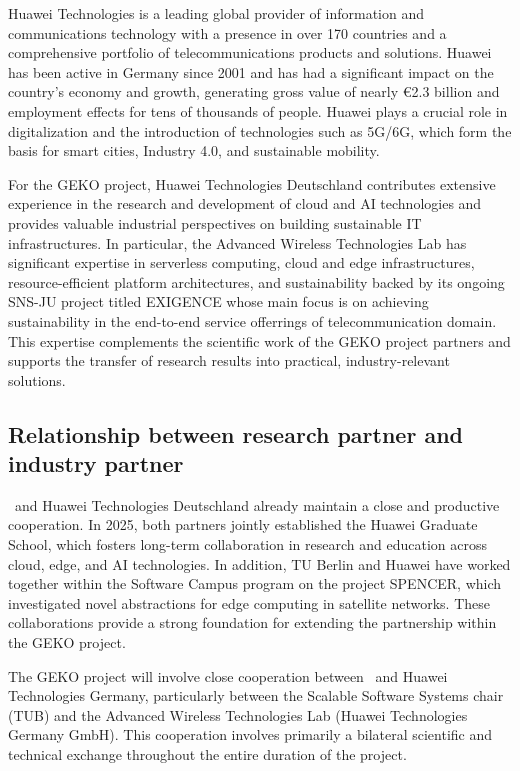 Huawei Technologies is a leading global provider of information and communications technology with a presence in over 170 countries and a comprehensive portfolio of telecommunications products and solutions.
Huawei has been active in Germany since 2001 and has had a significant impact on the country's economy and growth, generating gross value of nearly €2.3 billion and employment effects for tens of thousands of people.
Huawei plays a crucial role in digitalization and the introduction of technologies such as 5G/6G, which form the basis for smart cities, Industry 4.0, and sustainable mobility.

For the GEKO project, Huawei Technologies Deutschland contributes extensive experience in the research and development of cloud and AI technologies and provides valuable industrial perspectives on building sustainable IT infrastructures.
In particular, the Advanced Wireless Technologies Lab has significant expertise in serverless computing, cloud and edge infrastructures, resource-efficient platform architectures, and sustainability backed by its ongoing SNS-JU project titled EXIGENCE whose main focus is on achieving sustainability in the end-to-end service offerrings of telecommunication domain.
This expertise complements the scientific work of the GEKO project partners and supports the transfer of research results into practical, industry-relevant solutions.


\subsection{Relationship between research partner and industry partner}
\label{sec:partner:beziehung}


\TU\ and Huawei Technologies Deutschland already maintain a close and productive cooperation.
In 2025, both partners jointly established the Huawei Graduate School, which fosters long-term collaboration in research and education across cloud, edge, and AI technologies.
In addition, TU Berlin and Huawei have worked together within the Software Campus program on the project SPENCER, which investigated novel abstractions for edge computing in satellite networks.
These collaborations provide a strong foundation for extending the partnership within the GEKO project.

The GEKO project will involve close cooperation between \TU\ and Huawei Technologies Germany, particularly between the Scalable Software Systems chair (TUB) and the Advanced Wireless Technologies Lab (Huawei Technologies Germany GmbH).
This cooperation involves primarily a bilateral scientific and technical exchange throughout the entire duration of the project.

